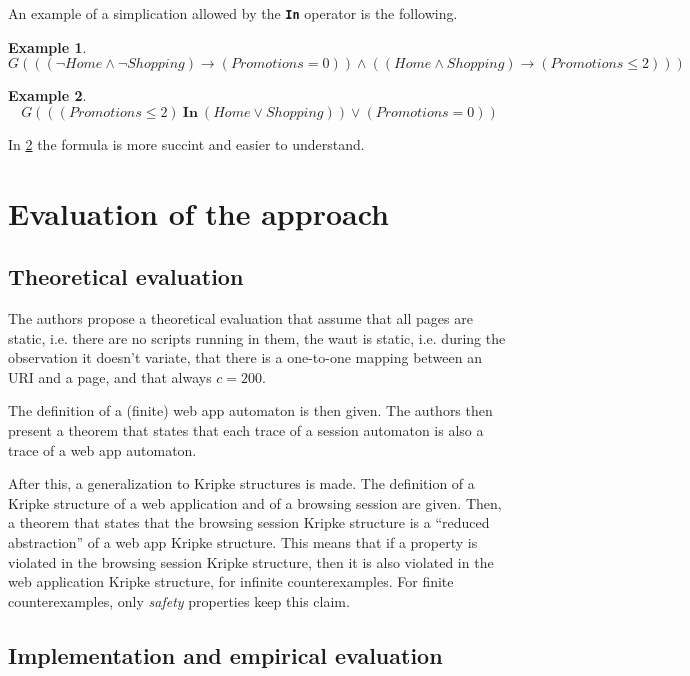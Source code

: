 \documentclass[a4paper,10pt]{article}
\theoremstyle{plain} %
\theoremstyle{definition}
\newtheorem{example}{Example}[section]
\theoremstyle{remark}
\begin{document}
An example of a simplication allowed by the \textbf{\texttt{In}} operator is the following.

\begin{example}
  $$
  G(((\neg Home\land\neg Shopping) \rightarrow (Promotions = 0))\land ((Home\land Shopping) \rightarrow (Promotions \leq 2)))
  $$
\end{example}

\begin{example}
  \label{example:in-operator-simple}
  $$
  G(((Promotions \leq 2)\ \textbf{In}\ (Home\lor Shopping))\lor(Promotions=0))
  $$
\end{example}

In \cref{example:in-operator-simple} the formula is more succint and easier to understand.

\section{Evaluation of the approach}

\subsection{Theoretical evaluation}

The authors propose a theoretical evaluation that assume that all pages are static, i.e. there are no scripts running in them, the \gls{waut} is static, i.e. during the observation it doesn't variate, that there is a one-to-one mapping between an URI and a page, and that always $c = 200$.

The definition of a (finite) web app automaton is then given. The authors then present a theorem that states that each trace of a session automaton is also a trace of a web app automaton.

After this, a generalization to Kripke structures is made. The definition of a Kripke structure of a web application and of a browsing session are given. Then, a theorem that states that the browsing session Kripke structure is a ``reduced abstraction'' of a web app Kripke structure. This means that if a property is violated in the browsing session Kripke structure, then it is also violated in the web application Kripke structure, for infinite counterexamples. For finite counterexamples, only \textit{safety} properties keep this claim.

\subsection{Implementation and empirical evaluation}
\end{document}
